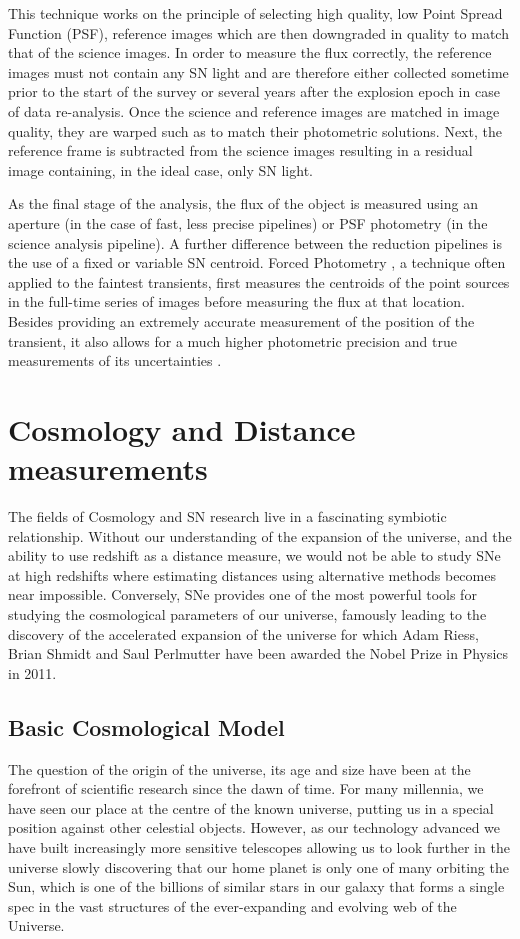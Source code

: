 This technique works on the principle of selecting high quality, low Point Spread Function (PSF), reference images which are then downgraded in quality to match that of the science images. In order to measure the flux correctly, the reference images must not contain any SN light and are therefore either collected sometime prior to the start of the survey or several years after the explosion epoch in case of data re-analysis. Once the science and reference images are matched in image quality, they are warped such as to match their photometric solutions. Next, the reference frame is subtracted from the science images resulting in a residual image containing, in the ideal case, only SN light.

As the final stage of the analysis, the flux of the object is measured using an aperture (in the case of fast, less precise pipelines) or PSF photometry (in the science analysis pipeline). A further difference between the reduction pipelines is the use of a fixed or variable SN centroid. Forced Photometry \citep{Bertin2011}, a technique often applied to the faintest transients, first measures the centroids of the point sources in the full-time series of images before measuring the flux at that location. Besides providing an extremely accurate measurement of the position of the transient, it also allows for a much higher photometric precision and true measurements of its uncertainties \citep{Firth2015}.

\section{Cosmology and Distance measurements}
The fields of Cosmology and SN research live in a fascinating symbiotic relationship. Without our understanding of the expansion of the universe, and the ability to use redshift as a distance measure, we would not be able to study SNe at high redshifts where estimating distances using alternative methods becomes near impossible. Conversely, SNe provides one of the most powerful tools for studying the cosmological parameters of our universe, famously leading to the discovery of the accelerated expansion of the universe \citep{Riess1998,Perlmutter1997} for which Adam Riess, Brian Shmidt and Saul Perlmutter have been awarded the Nobel Prize in Physics in 2011.

\subsection{Basic Cosmological Model}
The question of the origin of the universe, its age and size have been at the forefront of scientific research since the dawn of time. For many millennia, we have seen our place at the centre of the known universe, putting us in a special position against other celestial objects. However, as our technology advanced we have built increasingly more sensitive telescopes allowing us to look further in the universe slowly discovering that our home planet is only one of many orbiting the Sun, which is one of the billions of similar stars in our galaxy that forms a single spec in the vast structures of the ever-expanding and evolving web of the Universe.

